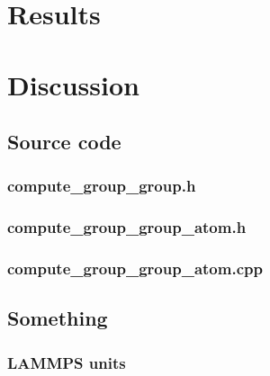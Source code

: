 \documentclass[twoside,english]{uiofysmaster}
\begin{document}
\part{Results}

\part{Discussion}





\appendix
\chapter{Source code}

\newpage
\section{compute\_group\_group.h}
\label{groupgrouph}


\newpage
\section{compute\_group\_group\_atom.h}



\newpage
\section{compute\_group\_group\_atom.cpp}



\chapter{Something}
\section{LAMMPS units}
\end{document}
